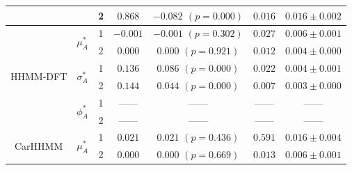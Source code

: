 \documentclass{article}
\begin{document}
\begin{center}
{\begin{tabular}{ccccccc}
                            &                               & 2                                & $0.868$                         & $-0.082$ $(p=0.000)$          & $0.016$                             & $0.016 \pm 0.002$                             \\ \hline
\multirow{6}{*}{HHMM-DFT}   & \multirow{2}{*}{$\mu_A^*$}    & 1                                & $-0.001$                         & $-0.001$ $(p=0.302)$          & $0.027$                             & $0.006 \pm 0.001$                             \\
                            &                               & 2                                & $0.000$                         & $0.000$ $(p=0.921)$          & $0.012$                             & $0.004 \pm 0.000$                             \\
                            & \multirow{2}{*}{$\sigma_A^*$} & 1                                & $0.136$                         & $0.086$ $(p=0.000)$          & $0.022$                             & $0.004 \pm 0.001$                             \\
                            &                               & 2                                & $0.144$                         & $0.044$ $(p=0.000)$          & $0.007$                             & $0.003 \pm 0.000$                             \\ 
                            & \multirow{2}{*}{$\phi_A^*$}   & 1                                & ------                         & ------                     & ------                             & ------                                      \\
                            &                               & 2                                & ------                         & ------                     & ------                             & ------                                      \\ \hline
\multirow{6}{*}{CarHHMM}    & \multirow{2}{*}{$\mu_A^*$}    & 1                                & $0.021$                         & $0.021$ $(p=0.436)$          & $0.591$                             & $0.016 \pm 0.004$                             \\
                            &                               & 2                                & $0.000$                         & $0.000$ $(p=0.669)$          & $0.013$                             & $0.006 \pm 0.001$                             \\

\end{tabular}}
\end{center}
\end{document}
